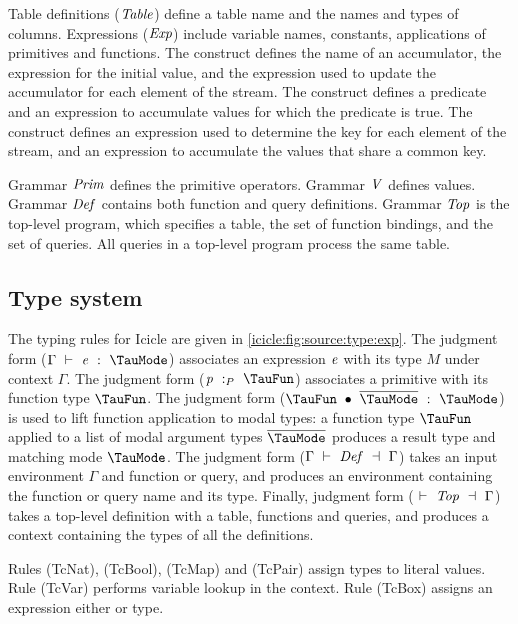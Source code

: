 Table definitions ($\mathit{Table}$) define a table name and the names and types of columns.
Expressions ($\mathit{Exp}$) include variable names, constants, applications of primitives and functions.
The \Ic@fold@ construct defines the name of an accumulator, the expression for the initial value, and the expression used to update the accumulator for each element of the stream.
The \Ic@filter@ construct defines a predicate and an expression to accumulate values for which the predicate is true.
The \Ic@group@ construct defines an expression used to determine the key for each element of the stream, and an expression to accumulate the values that share a common key.

Grammar $\mathit{Prim}$ defines the primitive operators.
Grammar $\mathit{V}$ defines values.
Grammar $\mathit{Def}$ contains both function and query definitions.
Grammar $\mathit{Top}$ is the top-level program, which specifies a table, the set of function bindings, and the set of queries.
All queries in a top-level program process the same table.


\subsection{Type system}
\label{icicle:s:ElementsAndAggregates:TypeSystem}

The typing rules for Icicle are given in \cref{icicle:fig:source:type:exp}.
The judgment form ($\Typecheck{\Gamma}{\mi{e}}{\TauMode}$) associates an expression $\mathit{e}$ with its type $M$ under context $\Gamma$.
The judgment form ($\TypecheckP{\mi{p}}{\TauFun}$) associates a primitive with its function type $\TauFun$.
The judgment form ($\TypecheckApp{\TauFun}{\ov{\TauMode}}{\TauMode}$) is used to lift function application to modal types: a function type $\TauFun$ applied to a list of modal argument types $\ov{\TauMode}$ produces a result type and matching mode $\TauMode$.
The judgment form ($\TypecheckS{\Gamma}{\mi{Def}}{\Gamma}$) takes an input environment $\Gamma$ and function or query, and produces an environment containing the function or query name and its type.
Finally, judgment form ($\TypecheckS{}{\mi{Top}}{\Gamma}$) takes a top-level definition with a table, functions and queries, and produces a context containing the types of all the definitions.




Rules (TcNat), (TcBool), (TcMap) and (TcPair) assign types to literal values.
Rule (TcVar) performs variable lookup in the context.
Rule (TcBox) assigns an expression either \Ic@Element@ or \Ic@Aggregate@ type. 

